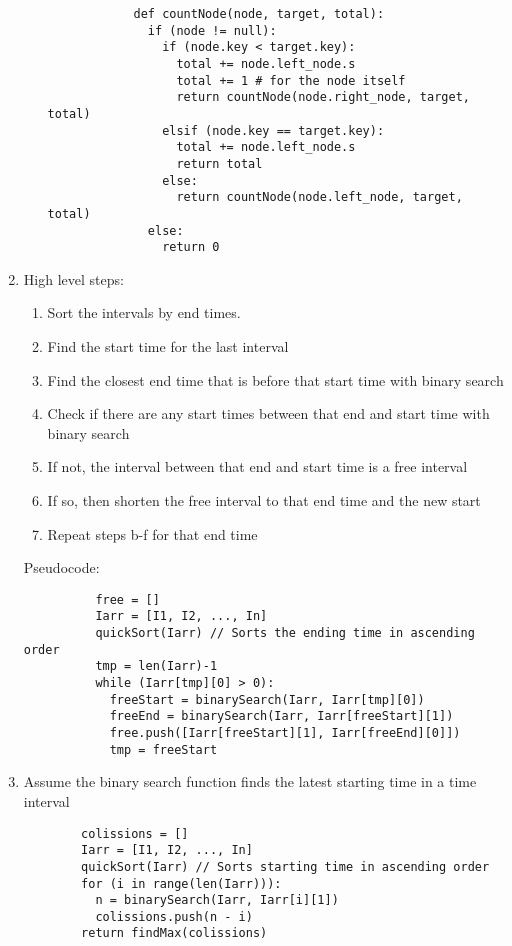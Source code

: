 \documentclass[11pt, letterpaper]{article}
\begin{document}
\begin{enumerate}
\begin{enumerate}
\begin{lstlisting}
            def countNode(node, target, total):
              if (node != null):
                if (node.key < target.key):
                  total += node.left_node.s
                  total += 1 # for the node itself
                  return countNode(node.right_node, target, total)
                elsif (node.key == target.key):
                  total += node.left_node.s
                  return total
                else:
                  return countNode(node.left_node, target, total)
              else:
                return 0
          \end{lstlisting}
      \end{enumerate}
    \item
        High level steps:
        \begin{enumerate}
          \item Sort the intervals by end times.
          \item Find the start time for the last interval
          \item Find the closest end time that is before that start time with binary search
          \item Check if there are any start times between that end and start time  with binary search
          \item If not, the interval between that end and start time is a free interval
          \item If so, then shorten the free interval to that end time and the new start
          \item Repeat steps b-f for that end time
        \end{enumerate}
        Pseudocode:
        \begin{lstlisting}
          free = []
          Iarr = [I1, I2, ..., In]
          quickSort(Iarr) // Sorts the ending time in ascending order
          tmp = len(Iarr)-1
          while (Iarr[tmp][0] > 0):
            freeStart = binarySearch(Iarr, Iarr[tmp][0])
            freeEnd = binarySearch(Iarr, Iarr[freeStart][1])
            free.push([Iarr[freeStart][1], Iarr[freeEnd][0]])
            tmp = freeStart
        \end{lstlisting}
    \item
      Assume the binary search function finds the latest starting time in a time interval
      \begin{lstlisting}
        colissions = []
        Iarr = [I1, I2, ..., In]
        quickSort(Iarr) // Sorts starting time in ascending order
        for (i in range(len(Iarr))):
          n = binarySearch(Iarr, Iarr[i][1])
          colissions.push(n - i)
        return findMax(colissions)
      \end{lstlisting}
  \end{enumerate}
\end{document}
